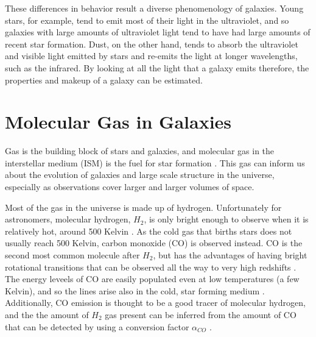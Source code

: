 \documentclass[twoside,single]{lion-msc}
\begin{document}
These differences in behavior result a diverse phenomenology of galaxies. Young stars, for example, tend to emit most of their light in the ultraviolet, and so galaxies with large amounts of ultraviolet light tend to have had large amounts of recent star formation. Dust, on the other hand, tends to absorb the ultraviolet and visible light emitted by stars and re-emits the light at longer wavelengths, such as the infrared. By looking at all the light that a galaxy emits therefore, the properties and makeup of a galaxy can be estimated.

\section{Molecular Gas in Galaxies}

Gas is the building block of stars and galaxies, and molecular gas in the interstellar medium (ISM) is the fuel for star formation \cite{decarli2019alma}. This gas can inform us about the evolution of galaxies and large scale structure in the universe, especially as observations cover larger and larger volumes of space. %


Most of the gas in the universe is made up of hydrogen. Unfortunately for astronomers, molecular hydrogen, $H_2$, is only bright enough to observe when it is relatively hot, around 500 Kelvin \cite{decarli2019alma}. As the cold gas that births stars does not usually reach 500 Kelvin, carbon monoxide (CO) is observed instead. CO is the second most common molecule after $H_2$, but has the advantages of having bright rotational transitions that can be observed all the way to very high redshifts \cite{carilli2013cool}. The energy leveels of CO are easily populated even at low temperatures (a few Kelvin), and so the lines arise also in the cold, star forming medium \cite{carilli2013cool}. Additionally, CO emission is thought to be a good tracer of molecular hydrogen, and the the amount of $H_2$ gas present can be inferred from the amount of CO that can be detected by using a conversion factor $\alpha_{CO}$ \cite{bolatto2013co}. 
\end{document}
